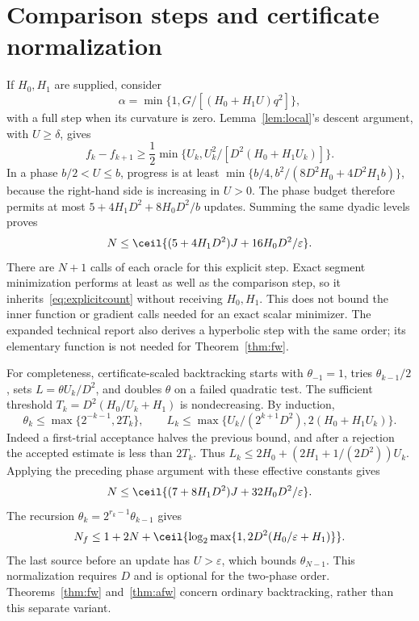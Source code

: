 \section{Comparison steps and certificate normalization}
\label{app:explicit}
If $H_0,H_1$ are supplied, consider
\[
 \alpha=\min\{1,G/[(H_0+H_1U)q^2]\},
\]
with a full step when its curvature is zero.
Lemma~\ref{lem:local}'s descent argument, with $U\ge\delta$,
gives
\[
 f_k-f_{k+1}\ge\frac12\min\{U_k,U_k^2/[D^2(H_0+H_1U_k)]\}.
\]
In a phase $b/2<U\le b$, progress is at least
$\min\{b/4,b^2/(8D^2H_0+4D^2H_1b)\}$, because the right-hand side
is increasing in $U>0$. The phase budget therefore permits at most
$5+4H_1D^2+8H_0D^2/b$ updates. Summing the same dyadic levels proves
\begin{equation}\label{eq:explicitcount}
 N\le\ceil{(5+4H_1D^2)J+16H_0D^2/\varepsilon}.
\end{equation}
There are $N+1$ calls of each oracle for this explicit step.
Exact segment minimization performs at least as well as the comparison
step, so it inherits~\eqref{eq:explicitcount} without receiving
$H_0,H_1$. This does not bound the inner function or gradient calls
needed for an exact scalar minimizer. The expanded technical report
also derives a hyperbolic step with the same order; its elementary
function is not needed for Theorem~\ref{thm:fw}.

For completeness, certificate-scaled backtracking starts with
$\theta_{-1}=1$, tries $\theta_{k-1}/2$, sets $L=\theta U_k/D^2$,
and doubles $\theta$ on a failed quadratic test. The sufficient
threshold $T_k=D^2(H_0/U_k+H_1)$ is nondecreasing. By induction,
\[
 \theta_k\le\max\{2^{-k-1},2T_k\},\qquad
 L_k\le\max\{U_k/(2^{k+1}D^2),2(H_0+H_1U_k)\}.
\]
Indeed a first-trial acceptance halves the previous bound, and after
a rejection the accepted estimate is less than $2T_k$.
Thus $L_k\le2H_0+(2H_1+1/(2D^2))U_k$. Applying the preceding
phase argument with these effective constants gives
\[
 N\le\ceil{(7+8H_1D^2)J+32H_0D^2/\varepsilon}.
\]
The recursion $\theta_k=2^{r_k-1}\theta_{k-1}$ gives
\[
 N_f\le1+2N+\ceil{\log_2\max\{1,2D^2(H_0/\varepsilon+H_1)\}}.
\]
The last source before an update has $U>\varepsilon$, which bounds
$\theta_{N-1}$. This normalization requires $D$ and is optional for
the two-phase order. Theorems~\ref{thm:fw} and~\ref{thm:afw} concern
ordinary backtracking, rather than this separate variant.

